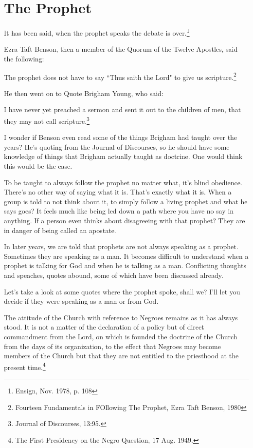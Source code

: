 \chapter{The Prophet}

It has been said, when the prophet speaks the debate is over.\footnote{
Ensign, Nov. 1978, p. 108
}

Ezra Taft Benson, then a member of the Quorum of the Twelve Apostles, said the
following:

\begin{displayquote}
The prophet does not have to say ``Thus saith the Lord" to give us
scripture.\footnote{Fourteen Fundamentals in FOllowing The Prophet, Ezra Taft 
Benson, 1980}
\end{displayquote}

He then went on to Quote Brigham Young, who said:

\begin{displayquote}
I have never yet preached a sermon and sent it out to the children of men, that 
they may not call scripture.\footnote{Journal of Discourses, 13:95.}
\end{displayquote}

I wonder if Benson even read some of the things Brigham had taught over the years?
He's quoting from the Journal of Discourses, so he should have some knowledge of
things that Brigham actually taught as doctrine. One would think this would be the
case.

To be taught to always follow the prophet no matter what, it's blind obedience.
There's no other way of saying what it is. That's exactly what it is. When a group is
told to not think about it, to simply follow a living prophet and what he says goes?
It feels much like being led down a path where you have no say in anything. If a
person even thinks about disagreeing with that prophet? They are in danger of being
called an apostate.

In later years, we are told that prophets are not always speaking as a prophet.
Sometimes they are speaking as a man. It becomes difficult to understand when a
prophet is talking for God and when he is talking as a man. Conflicting thoughts and
speaches, quotes abound, some of which have been discussed already.

Let's take a look at some quotes where the prophet spoke, shall we? I'll let you
decide if they were speaking as a man or from God.

\begin{displayquote}
The attitude of the Church with reference to Negroes remains as it has always 
stood. It is not a matter of the declaration of a policy but of direct commandment 
from the Lord, on which is founded the doctrine of the Church from the days of 
its organization, to the effect that Negroes may become members of the Church 
but that they are not entitled to the priesthood at the present time.\footnote{
The First Presidency on the Negro Question, 17 Aug. 1949.
}
\end{displayquote}

